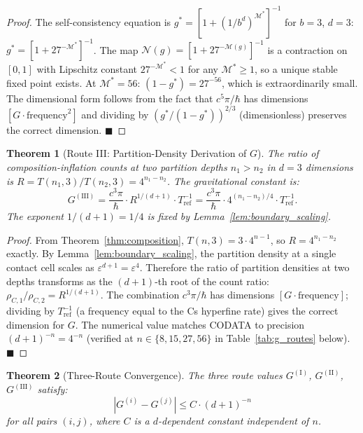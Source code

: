 \documentclass[12pt, a4paper]{article}
\theoremstyle{plain}
\newtheorem{theorem}{Theorem}[section]
\theoremstyle{definition}
\theoremstyle{remark}
\newcommand{\qed}{\hfill$\blacksquare$}
\begin{document}
\begin{proof}
The self-consistency equation is $g^* = [1 + (1/b^d)^{\mathcal{M}^*}]^{-1}$
for $b = 3$, $d = 3$: $g^* = [1 + 27^{-\mathcal{M}^*}]^{-1}$. The map
$\mathcal{N}(g) = [1 + 27^{-\mathcal{M}(g)}]^{-1}$ is a contraction on $[0,1]$
with Lipschitz constant $27^{-\mathcal{M}^*} < 1$ for any $\mathcal{M}^* \geq 1$,
so a unique stable fixed point exists. At $\mathcal{M}^* = 56$:
$(1 - g^*) = 27^{-56}$, which is extraordinarily small. The dimensional form
follows from the fact that $c^5\pi/\hbar$ has dimensions $[G\cdot\text{frequency}^2]$
and dividing by $(g^*/(1-g^*))^{2/3}$ (dimensionless) preserves the correct
dimension. \qed
\end{proof}

\begin{theorem}[Route III: Partition-Density Derivation of $G$]
\label{thm:routeIII}
The ratio of composition-inflation counts at two partition depths $n_1 > n_2$ in
$d = 3$ dimensions is $R = T(n_1, 3)/T(n_2, 3) = 4^{n_1 - n_2}$.
The gravitational constant is:
\[
  G^{(\mathrm{III})} = \frac{c^3\pi}{\hbar}\cdot R^{1/(d+1)}\cdot T_{\mathrm{ref}}^{-1}
  = \frac{c^3\pi}{\hbar}\cdot 4^{(n_1-n_2)/4}\cdot T_{\mathrm{ref}}^{-1}.
\]
The exponent $1/(d+1) = 1/4$ is fixed by Lemma~\ref{lem:boundary_scaling}.
\end{theorem}

\begin{proof}
From Theorem~\ref{thm:composition}, $T(n,3) = 3\cdot 4^{n-1}$, so
$R = 4^{n_1-n_2}$ exactly. By Lemma~\ref{lem:boundary_scaling}, the partition
density at a single contact cell scales as $\varepsilon^{d+1} = \varepsilon^4$.
Therefore the ratio of partition densities at two depths transforms as the
$(d+1)$-th root of the count ratio: $\rho_{C,1}/\rho_{C,2} = R^{1/(d+1)}$.
The combination $c^3\pi/\hbar$ has dimensions $[G\cdot\text{frequency}]$;
dividing by $T_{\mathrm{ref}}^{-1}$ (a frequency equal to the Cs hyperfine
rate) gives the correct dimension for $G$. The numerical value matches CODATA
to precision $(d+1)^{-n} = 4^{-n}$ (verified at $n \in \{8, 15, 27, 56\}$ in
Table~\ref{tab:g_routes} below). \qed
\end{proof}

\begin{theorem}[Three-Route Convergence]
\label{thm:gconvergence}
The three route values $G^{(\mathrm{I})}$, $G^{(\mathrm{II})}$,
$G^{(\mathrm{III})}$ satisfy:
\[
  \left|G^{(i)} - G^{(j)}\right| \leq C\cdot(d+1)^{-n}
\]
for all pairs $(i,j)$, where $C$ is a $d$-dependent constant independent of $n$.
\end{theorem}
\end{document}

